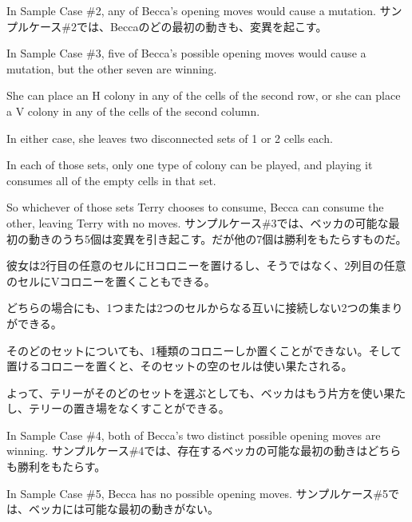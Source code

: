\documentclass[uplatex,dvipdfmx]{jsarticle} \usepackage{amsmath,amssymb,bm}
\begin{document}
\vspace{\baselineskip}
\begin{paracol}{2}
In Sample Case \#2, any of Becca's opening moves would cause a mutation.
\switchcolumn
サンプルケース\#2では、Beccaのどの最初の動きも、変異を起こす。
\end{paracol}
\vspace{\baselineskip}
\begin{paracol}{2}
In Sample Case \#3, five of Becca's possible opening moves would cause a mutation, but the other seven are winning.

She can place an H colony in any of the cells of the second row, or she can place a V colony in any of the cells of the second column.

In either case, she leaves two disconnected sets of 1 or 2 cells each.

In each of those sets, only one type of colony can be played, and playing it consumes all of the empty cells in that set.

So whichever of those sets Terry chooses to consume, Becca can consume the other, leaving Terry with no moves.
\switchcolumn
サンプルケース\#3では、ベッカの可能な最初の動きのうち5個は変異を引き起こす。だが他の7個は勝利をもたらすものだ。

彼女は2行目の任意のセルにHコロニーを置けるし、そうではなく、2列目の任意のセルにVコロニーを置くこともできる。

どちらの場合にも、1つまたは2つのセルからなる互いに接続しない2つの集まりができる。

そのどのセットについても、1種類のコロニーしか置くことができない。そして置けるコロニーを置くと、そのセットの空のセルは使い果たされる。

よって、テリーがそのどのセットを選ぶとしても、ベッカはもう片方を使い果たし、テリーの置き場をなくすことができる。
\end{paracol}
\vspace{\baselineskip}
\begin{paracol}{2}
In Sample Case \#4, both of Becca's two distinct possible opening moves are winning.
\switchcolumn
サンプルケース\#4では、存在するベッカの可能な最初の動きはどちらも勝利をもたらす。
\end{paracol}
\vspace{\baselineskip}
\begin{paracol}{2}
In Sample Case \#5, Becca has no possible opening moves.
\switchcolumn
サンプルケース\#5では、ベッカには可能な最初の動きがない。
\end{paracol}
\end{document}
